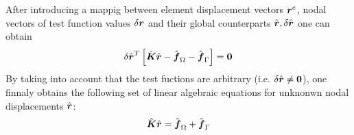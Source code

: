 After introducing a mappig between element displacement vectors $\mbox{\boldmath$r$}^e$, nodal vectors of test function values $\delta\mbox{\boldmath$r$}$ and their global counterparts $\hat{\mbox{\boldmath$r$}}, \delta\hat{\mbox{\boldmath$r$}}$ one can obtain
\begin{equation}
  \delta\hat{\mbox{\boldmath$r$}}^{T}
  \left[
    \hat{\mbox{\boldmath$K$}}\hat{\mbox{\boldmath$r$}}-\hat{\mbox{\boldmath$f$}}_\Omega - \hat{\mbox{\boldmath$f$}}_{\Gamma}
    \right] = \mbox{\boldmath$0$}
\end{equation}
By taking into account that the test fuctions are arbitrary (i.e. $\delta\hat{\mbox{\boldmath$r$}}\ne\mbox{\boldmath$0$}$), one finnaly obtains the following set of linear algebraic equations for unknonwn nodal displacements $\hat{\mbox{\boldmath$r$}}$:
\begin{equation}
    \hat{\mbox{\boldmath$K$}}\hat{\mbox{\boldmath$r$}}=\hat{\mbox{\boldmath$f$}}_\Omega + \hat{\mbox{\boldmath$f$}}_{\Gamma}
\end{equation}

